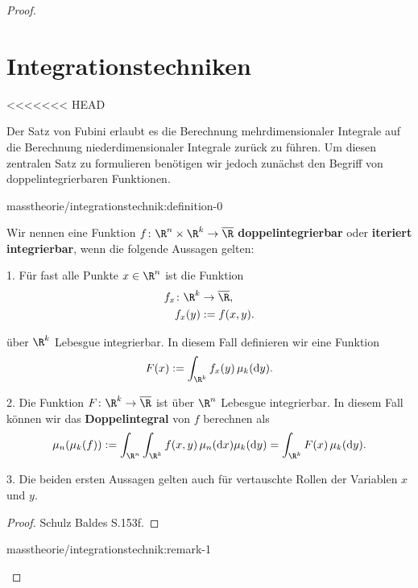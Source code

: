 \documentclass[letterpaper,10pt,english]{jupyterBook}
\begin{document}
\begin{proof}
\section{Integrationstechniken}
\label{\detokenize{masstheorie/integrationstechnik:integrationstechniken}}\label{\detokenize{masstheorie/integrationstechnik::doc}}
<<<<<<< HEAD
\par
Der Satz von Fubini erlaubt es die Berechnung mehrdimensionaler Integrale auf die Berechnung niederdimensionaler Integrale zurück zu führen.
Um diesen zentralen Satz zu formulieren benötigen wir jedoch zunächst den Begriff von doppelintegrierbaren Funktionen.
\begin{definition}{}{masstheorie/integrationstechnik:definition-0}



\par
Wir nennen eine Funktion \(f \colon \R^n \times \R^k \rightarrow \overline{\R}\) \textbf{doppelintegrierbar} oder \textbf{iteriert integrierbar},
wenn die folgende Aussagen gelten:

\par
1. Für fast alle Punkte \(x \in \R^n\) ist die Funktion
\begin{align*}
f_x \colon \R^k &\rightarrow \overline{\R},\\
f_x(y) &:= f(x,y).
\end{align*}
\par
über \(\R^k\) Lebesgue integrierbar.
In diesem Fall definieren wir eine Funktion
\begin{align*}
F(x) := \int_{\R^k} f_x(y) \, \mu_k(\mathrm{d}y).
\end{align*}
\par
2. Die Funktion \(F \colon \R^k \rightarrow \overline{\R}\) ist über \(\R^n\) Lebesgue integrierbar.
In diesem Fall können wir das \textbf{Doppelintegral} von \(f\) berechnen als
\begin{align*}
\mu_n(\mu_k(f)) := \int_{\R^n}\int_{\R^k} f(x,y) \, \mu_n(\mathrm{d}x) \mu_k(\mathrm{d}y) = \int_{\R^k} F(x) \, \mu_k(\mathrm{d}y).
\end{align*}
\par
3. Die beiden ersten Aussagen gelten auch für vertauschte Rollen der Variablen \(x\) und \(y\).
\end{definition}

\begin{proof}
 Schulz Baldes S.153f.
\end{proof}
\begin{remark}{}{masstheorie/integrationstechnik:remark-1}




\end{remark}
\end{proof}
\end{document}
